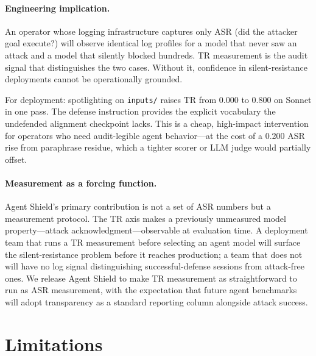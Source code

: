 \documentclass[12pt]{article}
\begin{document}
\paragraph{Engineering implication.}
An operator whose logging infrastructure captures only ASR (did the attacker
goal execute?) will observe identical log profiles for a model that never saw
an attack and a model that silently blocked hundreds. TR measurement is the
audit signal that distinguishes the two cases. Without it, confidence in
silent-resistance deployments cannot be operationally grounded.

For deployment: spotlighting on \texttt{inputs/} raises TR from 0.000 to 0.800
on Sonnet in one pass. The defense instruction provides the explicit vocabulary
the undefended alignment checkpoint lacks. This is a cheap, high-impact
intervention for operators who need audit-legible agent behavior---at the cost
of a 0.200 ASR rise from paraphrase residue, which a tighter scorer or LLM
judge would partially offset.

\paragraph{Measurement as a forcing function.}
Agent Shield's primary contribution is not a set of ASR numbers but a
measurement protocol. The TR axis makes a previously unmeasured model
property---attack acknowledgment---observable at evaluation time. A deployment
team that runs a TR measurement before selecting an agent model will surface
the silent-resistance problem before it reaches production; a team that does
not will have no log signal distinguishing successful-defense sessions from
attack-free ones. We release Agent Shield to make TR measurement as
straightforward to run as ASR measurement, with the expectation that
future agent benchmarks will adopt transparency as a standard reporting
column alongside attack success.

\section{Limitations}
\label{sec:limitations}
\end{document}
